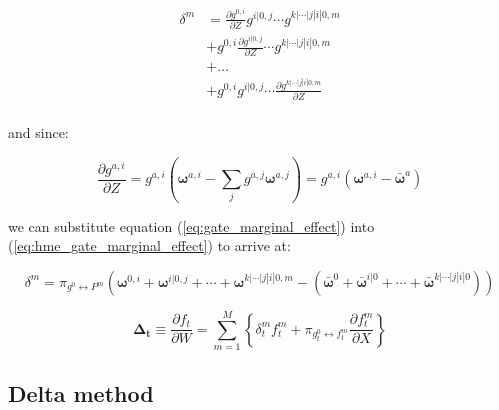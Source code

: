 \documentclass[12pt]{article}
\newcommand{\mean}[1]{\bar{#1}}
\newcommand{\gateprod}[2]{\pi_{#1 \longleftrightarrow #2}}
\begin{document}
\begin{equation} \label{eq:hme_gate_marginal_effect}
  \begin{split}
    \delta^{m} &= \frac{\partial g^{0, i}}{\partial Z} g^{i|0, j} \cdots g^{k|\cdots|j|i|0, m} \\
                                     &+ g^{0, i} \frac{\partial g^{i|0, j}}{\partial Z} \cdots g^{k|\cdots|j|i|0, m} \\
                                     &+ \dots                                                                        \\
                                     &+ g^{0, i} g^{i|0, j} \cdots \frac{\partial g^{k|\cdots|j|i|0, m}}{\partial Z} \\
  \end{split}
\end{equation}

and since:

\begin{equation} \label{eq:gate_marginal_effect}
  \frac{\partial g^{a, i}}{\partial Z} = g^{a, i} \left( \boldsymbol{\omega}^{a, i} - \sum_{j} g^{a, j} \boldsymbol{\omega}^{a, j} \right) = g^{a, i} \left( \boldsymbol{\omega}^{a, i} - \mean{\boldsymbol{\omega}}^{a} \right)
\end{equation}

we can substitute equation (\ref{eq:gate_marginal_effect}) into
(\ref{eq:hme_gate_marginal_effect}) to arrive at:

\begin{equation} \label{eq:marginal_effects}
  \delta^{m} = \gateprod{g^{0}}{P^{m}} \left(\boldsymbol{\omega}^{0, i} + \boldsymbol{\omega}^{i|0, j} + \cdots + \boldsymbol{\omega}^{k|\cdots|j|i|0, m} - \left( \mean{\boldsymbol{\omega}}^{0} + \mean{\boldsymbol{\omega}}^{i|0} + \cdots + \mean{\boldsymbol{\omega}}^{k|\cdots|j|i|0} \right) \right)
\end{equation}


\begin{equation} \label{eq:ME_both2}
  \boldsymbol{\Delta_{t}} \equiv \frac{\partial f_{t}}{\partial W} = \sum_{m=1}^{M} \left\{ \delta^{m}_{t} f^{m}_{t} + \gateprod{g^{0}_{t}}{f^{m}_{t}} \frac{\partial f^{m}_{t}}{{\partial X}} \right\}
\end{equation}


\subsection{Delta method}
\end{document}
